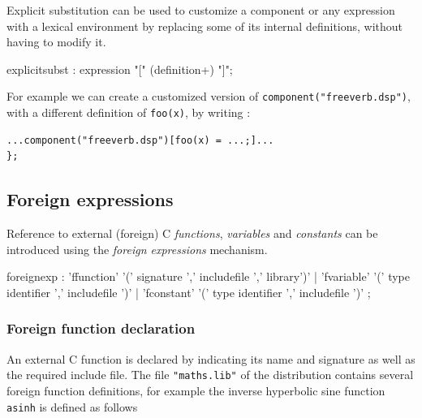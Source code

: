 Explicit substitution can be used to customize a component or any expression with a lexical environment by replacing some of its internal definitions, without having to modify it.


\begin{rail}
explicitsubst : expression "[" (definition+) "]";
\end{rail}

For example we can create a customized version of \lstinline'component("freeverb.dsp")', with a different definition of \lstinline'foo(x)', by writing :
\begin{lstlisting}
...component("freeverb.dsp")[foo(x) = ...;]...
};
\end{lstlisting}

\subsection{Foreign expressions}

Reference to external (foreign) C \textit{functions}, \textit{variables} and \textit{constants} can be introduced using the \textit{foreign expressions} mechanism.
 
\begin{rail}
foreignexp : 'ffunction' '(' signature ',' includefile ',' library')' 
          | 'fvariable' '(' type identifier ',' includefile ')' 
          | 'fconstant' '(' type identifier ',' includefile ')' ;
\end{rail}

\subsubsection{Foreign function declaration} 

An external C function is declared by indicating its name and signature as well as the required include file.
The file \lstinline'"maths.lib"' of the \faust distribution contains several foreign function definitions, for example the inverse hyperbolic sine function \lstinline'asinh' is defined as follows

